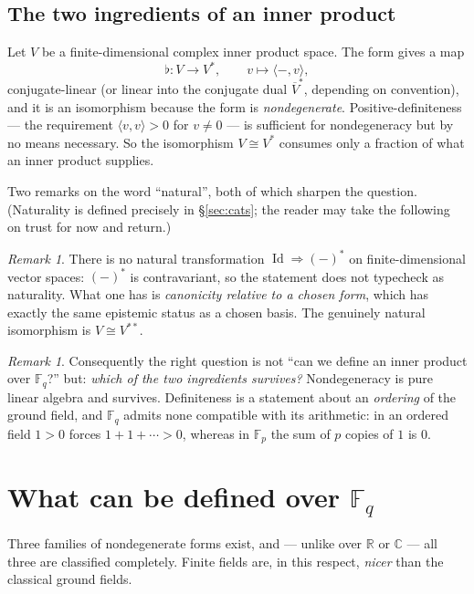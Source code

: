 \documentclass[11pt,a4paper]{article}
\theoremstyle{definition}
\theoremstyle{remark}
\newtheorem{remark}[theorem]{Remark}
\newcommand{\FF}{\mathbb{F}}
\newcommand{\CC}{\mathbb{C}}
\newcommand{\RR}{\mathbb{R}}
\newcommand{\ip}[2]{\langle #1, #2 \rangle}
\newcommand{\dual}[1]{#1^{*}}
\DeclareMathOperator{\Id}{Id}
\begin{document}
\subsection{The two ingredients of an inner product}

Let $V$ be a finite-dimensional complex inner product space. The form gives a map
\[
  \flat : V \longrightarrow \dual{V}, \qquad v \longmapsto \ip{-}{v},
\]
conjugate-linear (or linear into the conjugate dual $\overline{V}^{*}$, depending on
convention), and it is an isomorphism because the form is \emph{nondegenerate}.
Positive-definiteness --- the requirement $\ip{v}{v} > 0$ for $v \neq 0$ --- is sufficient
for nondegeneracy but by no means necessary. So the isomorphism $V \cong \dual{V}$ consumes
only a fraction of what an inner product supplies.

Two remarks on the word ``natural'', both of which sharpen the question. (Naturality is
defined precisely in \S\ref{sec:cats}; the reader may take the following on trust for now
and return.)

\begin{remark}
There is no natural transformation $\Id \Rightarrow (-)^{*}$ on finite-dimensional vector
spaces: $(-)^{*}$ is contravariant, so the statement does not typecheck as naturality. What
one has is \emph{canonicity relative to a chosen form}, which has exactly the same epistemic
status as a chosen basis. The genuinely natural isomorphism is $V \cong V^{**}$.
\end{remark}

\begin{remark}\label{rem:ordering}
Consequently the right question is not ``can we define an inner product over $\FF_q$?'' but:
\emph{which of the two ingredients survives?} Nondegeneracy is pure linear algebra and
survives. Definiteness is a statement about an \emph{ordering} of the ground field, and
$\FF_q$ admits none compatible with its arithmetic: in an ordered field $1 > 0$ forces
$1 + 1 + \cdots > 0$, whereas in $\FF_p$ the sum of $p$ copies of $1$ is $0$.
\end{remark}

\section{What can be defined over $\FF_q$}\label{sec:forms}

Three families of nondegenerate forms exist, and --- unlike over $\RR$ or $\CC$ --- all
three are classified completely. Finite fields are, in this respect, \emph{nicer} than the
classical ground fields.
\end{document}
